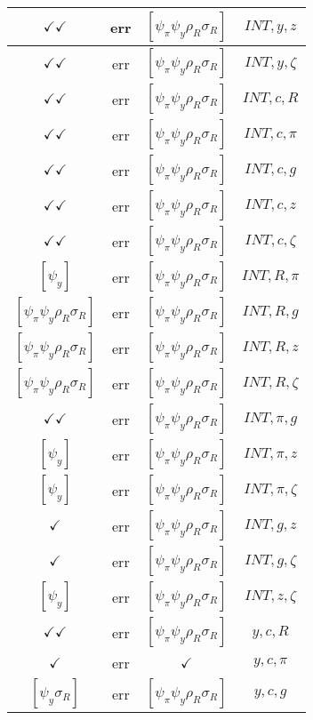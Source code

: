 \documentclass[a4paper,10pt]{article}
\begin{document}
\begin{longtable}{|c|c|c|c|}
\hline
$\checkmark\checkmark$ & err & $[\psi_\pi \psi_y \rho_R \sigma_R ]$ & ${INT},{y},{z}$ \\
\hline
$\checkmark\checkmark$ & err & $[\psi_\pi \psi_y \rho_R \sigma_R ]$ & ${INT},{y},{\zeta}$ \\
\hline
$\checkmark\checkmark$ & err & $[\psi_\pi \psi_y \rho_R \sigma_R ]$ & ${INT},{c},{R}$ \\
\hline
$\checkmark\checkmark$ & err & $[\psi_\pi \psi_y \rho_R \sigma_R ]$ & ${INT},{c},{\pi}$ \\
\hline
$\checkmark\checkmark$ & err & $[\psi_\pi \psi_y \rho_R \sigma_R ]$ & ${INT},{c},{g}$ \\
\hline
$\checkmark\checkmark$ & err & $[\psi_\pi \psi_y \rho_R \sigma_R ]$ & ${INT},{c},{z}$ \\
\hline
$\checkmark\checkmark$ & err & $[\psi_\pi \psi_y \rho_R \sigma_R ]$ & ${INT},{c},{\zeta}$ \\
\hline
$[\psi_y ]$ & err & $[\psi_\pi \psi_y \rho_R \sigma_R ]$ & ${INT},{R},{\pi}$ \\
\hline
$[\psi_\pi \psi_y \rho_R \sigma_R ]$ & err & $[\psi_\pi \psi_y \rho_R \sigma_R ]$ & ${INT},{R},{g}$ \\
\hline
$[\psi_\pi \psi_y \rho_R \sigma_R ]$ & err & $[\psi_\pi \psi_y \rho_R \sigma_R ]$ & ${INT},{R},{z}$ \\
\hline
$[\psi_\pi \psi_y \rho_R \sigma_R ]$ & err & $[\psi_\pi \psi_y \rho_R \sigma_R ]$ & ${INT},{R},{\zeta}$ \\
\hline
$\checkmark\checkmark$ & err & $[\psi_\pi \psi_y \rho_R \sigma_R ]$ & ${INT},{\pi},{g}$ \\
\hline
$[\psi_y ]$ & err & $[\psi_\pi \psi_y \rho_R \sigma_R ]$ & ${INT},{\pi},{z}$ \\
\hline
$[\psi_y ]$ & err & $[\psi_\pi \psi_y \rho_R \sigma_R ]$ & ${INT},{\pi},{\zeta}$ \\
\hline
$\checkmark$ & err & $[\psi_\pi \psi_y \rho_R \sigma_R ]$ & ${INT},{g},{z}$ \\
\hline
$\checkmark$ & err & $[\psi_\pi \psi_y \rho_R \sigma_R ]$ & ${INT},{g},{\zeta}$ \\
\hline
$[\psi_y ]$ & err & $[\psi_\pi \psi_y \rho_R \sigma_R ]$ & ${INT},{z},{\zeta}$ \\
\hline
$\checkmark\checkmark$ & err & $[\psi_\pi \psi_y \rho_R \sigma_R ]$ & ${y},{c},{R}$ \\
\hline
$\checkmark$ & err & $\checkmark$ & ${y},{c},{\pi}$ \\
\hline
$[\psi_y \sigma_R ]$ & err & $[\psi_\pi \psi_y \rho_R \sigma_R ]$ & ${y},{c},{g}$ \\

\end{longtable}
\end{document}

